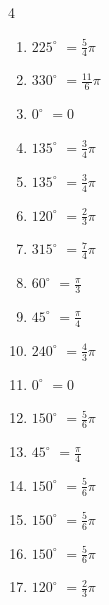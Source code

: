 \begin{multicols}{4}
\begin{enumerate}
  \item $\displaystyle 225^{\circ}$
        $\displaystyle =\frac{5}{4}\pi$

\columnbreak %

  \item $\displaystyle 330^{\circ}$
        $\displaystyle =\frac{11}{6}\pi$

  \item $\displaystyle 0^{\circ}$
        $\displaystyle =0$

  \item $\displaystyle 135^{\circ}$
        $\displaystyle =\frac{3}{4}\pi$

  \item $\displaystyle 135^{\circ}$
        $\displaystyle =\frac{3}{4}\pi$

  \item $\displaystyle 120^{\circ}$
        $\displaystyle =\frac{2}{3}\pi$

  \item $\displaystyle 315^{\circ}$
        $\displaystyle =\frac{7}{4}\pi$

  \item $\displaystyle 60^{\circ}$
        $\displaystyle =\frac{\pi}{3}$

  \item $\displaystyle 45^{\circ}$
        $\displaystyle =\frac{\pi}{4}$

  \item $\displaystyle 240^{\circ}$
        $\displaystyle =\frac{4}{3}\pi$

  \item $\displaystyle 0^{\circ}$
        $\displaystyle =0$

  \item $\displaystyle 150^{\circ}$
        $\displaystyle =\frac{5}{6}\pi$

  \item $\displaystyle 45^{\circ}$
        $\displaystyle =\frac{\pi}{4}$

  \item $\displaystyle 150^{\circ}$
        $\displaystyle =\frac{5}{6}\pi$

  \item $\displaystyle 150^{\circ}$
        $\displaystyle =\frac{5}{6}\pi$

  \item $\displaystyle 150^{\circ}$
        $\displaystyle =\frac{5}{6}\pi$

  \item $\displaystyle 120^{\circ}$
        $\displaystyle =\frac{2}{3}\pi$


\end{enumerate}
\end{multicols}

